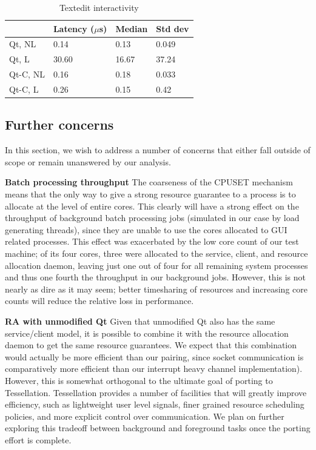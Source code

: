 \documentclass[letterpaper,twocolumn,10pt]{article}
\begin{document}
\begin{table}[htp]
\caption{Textedit interactivity}
\label{tab:textedit_table}
\centering
\begin{tabular}{|l | l | l | l |}
\hline
	&Latency ($\mu$s)	&Median	&Std dev\\ \hline
Qt, NL	&0.14	&0.13	&0.049\\
Qt, L	&30.60	&16.67	&37.24\\
Qt-C, NL	&0.16	&0.18	&0.033\\
Qt-C, L	&0.26	&0.15	&0.42\\
\hline
\end{tabular}
\end{table}

\subsection{Further concerns}

In this section, we wish to address a number of concerns that either fall outside of scope or remain unanswered by our analysis.

\textbf{Batch processing throughput} The coarseness of the CPUSET mechanism means that the only way to give a strong resource guarantee to a process is to allocate at the level of entire cores. This clearly will have a strong effect on the throughput of background batch processing jobs (simulated in our case by load generating threads), since they are unable to use the cores allocated to GUI related processes. This effect was exacerbated by the low core count of our test machine; of its four cores, three were allocated to the service, client, and resource allocation daemon, leaving just one out of four for all remaining system processes and thus one fourth the throughput in our background jobs. However, this is not nearly as dire as it may seem; better timesharing of resources and increasing core counts will reduce the relative loss in performance.

\textbf{RA with unmodified Qt} Given that unmodified Qt also has the same service/client model, it is possible to combine it with the resource allocation daemon to get the same resource guarantees. We expect that this combination would actually be more efficient than our pairing, since socket communication is comparatively more efficient than our interrupt heavy channel implementation). However, this is somewhat orthogonal to the ultimate goal of porting to Tessellation. Tessellation provides a number of facilities that will greatly improve efficiency, such as lightweight user level signals, finer grained resource scheduling policies, and more explicit control over communication. We plan on further exploring this tradeoff between background and foreground tasks once the porting effort is complete.
\end{document}
